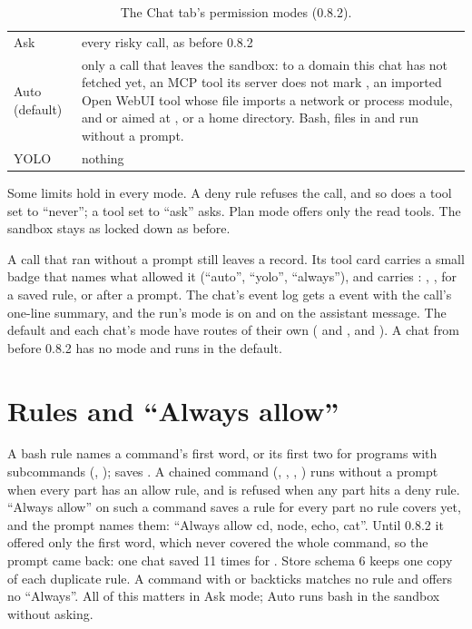 \begin{table}[htbp]
\centering\small
\caption{The Chat tab's permission modes (0.8.2).}\label{tab:chat-modes}
\begin{tabularx}{\linewidth}{@{}L{.16\linewidth}Y@{}}
\toprule
{} &  \\
\midrule
Ask & every risky call, as before 0.8.2 \\
Auto (default) & only a call that leaves the sandbox:  to a domain this chat has not fetched yet, an MCP tool its server does not mark , an imported Open WebUI tool whose file imports a network or process module, and  or  aimed at \code{/},  or a home directory. Bash, files in  and  run without a prompt. \\
YOLO & nothing \\
\bottomrule
\end{tabularx}
\end{table}

Some limits hold in every mode. A deny rule refuses the call, and so does a tool set to \enquote{never}; a tool set to \enquote{ask} asks. Plan mode offers only the read tools. The sandbox stays as locked down as before.

A call that ran without a prompt still leaves a record. Its tool card carries a small badge that names what allowed it (\enquote{auto}, \enquote{yolo}, \enquote{always}), and  carries : , ,  for a saved rule, or  after a prompt. The chat's event log gets a  event with the call's one-line summary, and the run's mode is on  and on the assistant message. The default and each chat's mode have routes of their own ( and , and ). A chat from before 0.8.2 has no mode and runs in the default.

\section{Rules and \enquote{Always allow}}

A bash rule names a command's first word, or its first two for programs with subcommands (, );  saves . A chained command (\code{&&}, \code{||}, \code{;}, \code{|}) runs without a prompt when every part has an allow rule, and is refused when any part hits a deny rule. \enquote{Always allow} on such a command saves a rule for every part no rule covers yet, and the prompt names them: \enquote{Always allow cd, node, echo, cat}. Until 0.8.2 it offered only the first word, which never covered the whole command, so the prompt came back: one chat saved  11 times for . Store schema 6 keeps one copy of each duplicate rule. A command with  or backticks matches no rule and offers no \enquote{Always}. All of this matters in Ask mode; Auto runs bash in the sandbox without asking.

